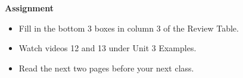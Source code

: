 \begin{center}
  {\large\bf Assignment}
\end{center}

\begin{itemize}
\item Fill in the bottom 3 boxes in column 3 of the Review Table. 
\item Watch  videos 12 and 13 under Unit 3 Examples.
\item Read the next two pages before your next class.
\end{itemize}
